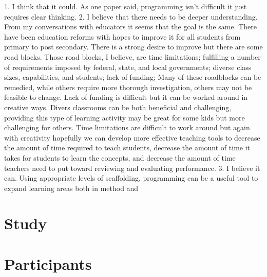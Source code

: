 \documentclass[12pt]{extarticle}
\begin{document}
1. I think that it could. As one paper said, programming isn't difficult it just requires clear thinking. 
2. I believe that there needs to be deeper understanding. From my conversations with educators it seems that the goal is the same. There have been education reforms with hopes to improve it for all students from primary to post secondary. There is a strong desire to improve but there are some road blocks. 
	Those road blocks, I believe, are time limitations; fulfilling a number of requirements imposed by federal, state, and local governments; diverse class sizes, capabilities, and students; lack of funding;
	Many of these roadblocks can be remedied, while others require more thorough investigation, others may not be feasible to change. Lack of funding is difficult but it can be worked around in creative ways. Divers classrooms can be both beneficial and challenging, providing this type of learning activity may be great for some kids but more challenging for others. Time limitations are difficult to work around but again with creativity hopefully we can develop more effective teaching tools to decrease the amount of time required to teach students, decrease the amount of time it takes for students to learn the concepts, and decrease the amount of time teachers need to put toward reviewing and evaluating performance.
3. I believe it can. Using appropriate levels of scaffolding, programming can be a useful tool to expand learning areas both in method and 


\section*{Study}

\section*{Participants}
\end{document}
